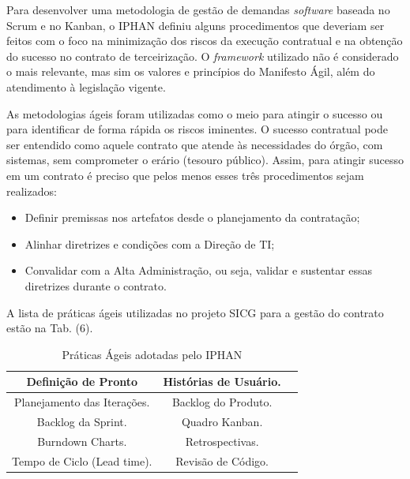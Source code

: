Para desenvolver uma metodologia de gestão de demandas \textit{software} baseada no Scrum e no Kanban, o IPHAN definiu alguns procedimentos que deveriam ser feitos com o foco na minimização dos riscos da execução contratual e na obtenção do sucesso no contrato de terceirização. O \textit{framework} utilizado não é considerado o mais relevante, mas sim os valores e princípios do Manifesto Ágil, além do atendimento à legislação vigente. 

As metodologias ágeis foram utilizadas como o meio para atingir o sucesso ou para identificar de forma rápida os riscos iminentes. O sucesso contratual pode ser entendido como aquele contrato que atende às necessidades do órgão, com sistemas, sem comprometer o erário (tesouro público). Assim, para atingir sucesso em um contrato é preciso que pelos menos esses três procedimentos sejam realizados: 
\begin{itemize}
\item Definir premissas nos artefatos desde o planejamento da contratação;
\item Alinhar diretrizes e condições com a Direção de TI;
\item Convalidar com a Alta Administração, ou seja, validar e sustentar essas diretrizes durante o contrato.
\end{itemize}

A lista de práticas ágeis utilizadas no projeto SICG para a gestão do contrato estão na Tab. (6).

\begin{table}[H]
\center
\footnotesize
\begin{tabular}{|c|c|c|}
\hline
 Definição de Pronto              &   Histórias de Usuário.              \\ \hline
Planejamento das Iterações.  &  Backlog do Produto.           \\ \hline
  Backlog da Sprint.             &   Quadro Kanban.              \\ \hline
Burndown Charts.         &  Retrospectivas.            \\ \hline
Tempo de Ciclo (Lead time).         &  Revisão de Código.               \\ \hline
\end{tabular}
\caption{Práticas Ágeis adotadas pelo IPHAN}
\end{table}


